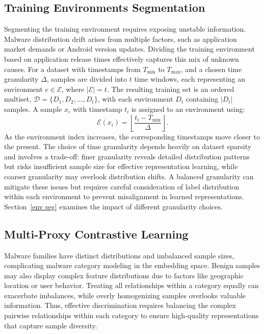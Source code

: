 \subsection{Training Environments Segmentation}
\label{environment_split}
Segmenting the training environment requires exposing unstable information. Malware distribution drift arises from multiple factors, such as application market demands or Android version updates. Dividing the training environment based on application release times effectively captures this mix of unknown causes. For a dataset with timestamps from $T_{\min}$ to $T_{\max}$, and a chosen time granularity $\Delta$, samples are divided into $t$ time windows, each representing an environment $e \in \mathcal{E}$, where $|\mathcal{E}| = t$. The resulting training set is an ordered multiset, $\mathcal{D} = \{D_1,D_2,...,D_t\}$, with each environment $D_t$ containing $|D_t|$ samples. A sample $x_i$ with timestamp $t_i$ is assigned to an environment using:
\begin{equation}
\mathcal{E}(x_i)=\left\lfloor\frac{t_i-T_{\min }}{\Delta}\right\rfloor.
\end{equation}
As the environment index increases, the corresponding timestamps move closer to the present. The choice of time granularity depends heavily on dataset sparsity and involves a trade-off: finer granularity reveals detailed distribution patterns but risks insufficient sample size for effective representation learning, while coarser granularity may overlook distribution shifts. A balanced granularity can mitigate these issues but requires careful consideration of label distribution within each environment to prevent misalignment in learned representations. Section~\ref{env seg} examines the impact of different granularity choices.

\subsection{Multi-Proxy Contrastive Learning}
\label{multi-proxy contrastive learning}
Malware families have distinct distributions and imbalanced sample sizes, complicating malware category modeling in the embedding space. Benign samples may also display complex feature distributions due to factors like geographic location or user behavior. Treating all relationships within a category equally can exacerbate imbalances, while overly homogenizing samples overlooks valuable information. Thus, effective discrimination requires balancing the complex pairwise relationships within each category to ensure high-quality representations that capture sample diversity.

